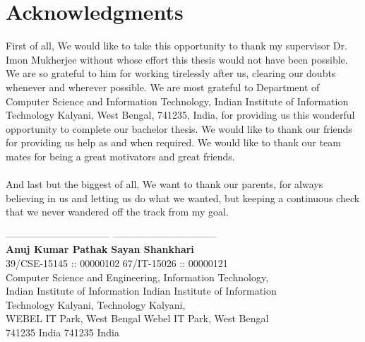 \chapter*{Acknowledgments}
First of all, We would like to take this opportunity to thank my supervisor Dr. Imon Mukherjee without whose effort this thesis would not have been possible. We are so grateful to him for working tirelessly after us, clearing our doubts whenever and wherever possible. We are most grateful to Department of Computer Science and Information Technology, Indian Institute of Information Technology Kalyani, West Bengal, 741235, India, for providing us this wonderful opportunity to complete our bachelor thesis. We would like to thank our friends for providing us help as and when required. We would like to thank our team mates for being a great motivators and great friends. \\
\\
\linebreak And last but the biggest of all, We want to thank our parents, for always believing in us and letting us do what we wanted, but keeping a continuous check that we never wandered off the track from my goal. \\

\bigskip
\bigskip
\bigskip
\bigskip

\noindent
-------------------------------- \hfill -------------------------------- \\
\textbf{Anuj Kumar Pathak} \hfill \textbf{Sayan Shankhari} \\
39/CSE-15145 :: 00000102 \hfill 67/IT-15026 :: 00000121 \\
Computer Science and Engineering, \hfill Information Technology, \\
Indian Institute of Information \hfill Indian Institute of Information\\
Technology Kalyani, \hfill Technology Kalyani, \\
WEBEL IT Park, West Bengal \hfill Webel IT Park, West Bengal \\
741235 India \hfill 741235 India
